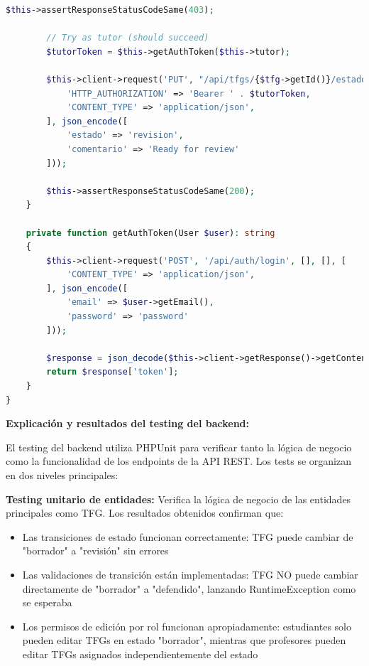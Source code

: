 \documentclass[12pt,a4paper,oneside]{report}
\begin{document}
\begin{lstlisting}[language=PHP]
        $this->assertResponseStatusCodeSame(403);

        // Try as tutor (should succeed)
        $tutorToken = $this->getAuthToken($this->tutor);
        
        $this->client->request('PUT', "/api/tfgs/{$tfg->getId()}/estado", [], [], [
            'HTTP_AUTHORIZATION' => 'Bearer ' . $tutorToken,
            'CONTENT_TYPE' => 'application/json',
        ], json_encode([
            'estado' => 'revision',
            'comentario' => 'Ready for review'
        ]));

        $this->assertResponseStatusCodeSame(200);
    }

    private function getAuthToken(User $user): string
    {
        $this->client->request('POST', '/api/auth/login', [], [], [
            'CONTENT_TYPE' => 'application/json',
        ], json_encode([
            'email' => $user->getEmail(),
            'password' => 'password'
        ]));

        $response = json_decode($this->client->getResponse()->getContent(), true);
        return $response['token'];
    }
}
\end{lstlisting}

\textbf{Explicación y resultados del testing del backend:}

El testing del backend utiliza PHPUnit para verificar tanto la lógica de negocio como la funcionalidad de los endpoints de la API REST. Los tests se organizan en dos niveles principales:

\textbf{Testing unitario de entidades:} Verifica la lógica de negocio de las entidades principales como TFG. Los resultados obtenidos confirman que:
\begin{itemize}
\item Las transiciones de estado funcionan correctamente: TFG puede cambiar de "borrador" a "revisión" sin errores
\item Las validaciones de transición están implementadas: TFG NO puede cambiar directamente de "borrador" a "defendido", lanzando RuntimeException como se esperaba
\item Los permisos de edición por rol funcionan apropiadamente: estudiantes solo pueden editar TFGs en estado "borrador", mientras que profesores pueden editar TFGs asignados independientemente del estado
\end{itemize}
\end{document}
